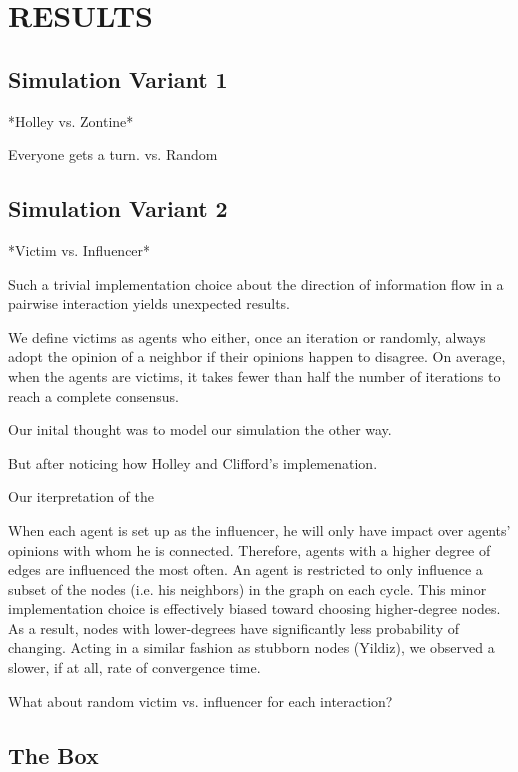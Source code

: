 
\section{RESULTS}

\subsection{Simulation Variant 1}
*Holley vs. Zontine*

Everyone gets a turn. vs. Random





\subsection{Simulation Variant 2}

*Victim vs. Influencer*

Such a trivial implementation choice about the direction of information flow 
in a pairwise interaction yields unexpected results.

We define victims as agents who either, once an iteration or randomly, always 
adopt the opinion of a neighbor if their opinions happen to disagree. On 
average, when the agents are victims, it takes fewer than half the number
of iterations to reach a complete consensus.

Our inital thought was to model our simulation the other way.

But after noticing how Holley and Clifford's implemenation.

Our iterpretation of the 

When each agent is set up as the influencer, he will only have impact over
agents' opinions with whom he is connected. Therefore, agents with a higher
degree of edges are influenced the most often. An agent is restricted to only 
influence a subset of the nodes (i.e. his neighbors) in the graph on each 
cycle. This minor implementation choice is effectively biased toward choosing
higher-degree nodes. As a result, nodes with lower-degrees have significantly
less probability of changing. Acting in a similar fashion as stubborn nodes 
(Yildiz), we observed a slower, if at all, rate of convergence time.


What about random victim vs. influencer for each interaction?


\subsection{The Box}
